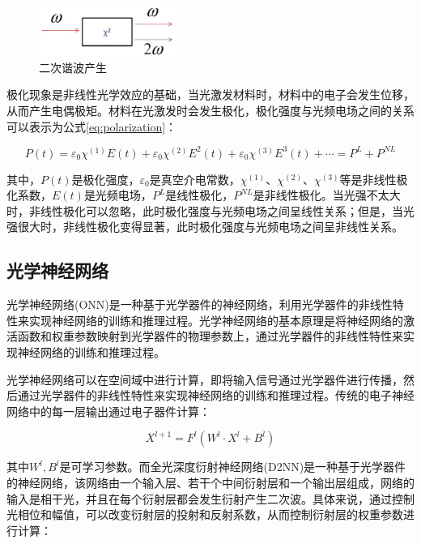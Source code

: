 \begin{figure}[H]
    \centering
    \includegraphics[width=0.4\textwidth]{pics/shg.png}
    \caption{二次谐波产生}
    \label{fig:shg}
\end{figure}

极化现象是非线性光学效应的基础，当光激发材料时，材料中的电子会发生位移，从而产生电偶极矩。材料在光激发时会发生极化，极化强度与光频电场之间的关系可以表示为公式\ref{eq:polarization}：

\begin{equation}
    P(t) = \varepsilon_0 \chi^{(1)} E(t) + \varepsilon_0 \chi^{(2)} E^2(t) + \varepsilon_0 \chi^{(3)} E^3(t) + \cdots = P^L + P^{NL}
    \label{eq:polarization}
\end{equation}

其中，$P(t)$是极化强度，$\varepsilon_0$是真空介电常数，$\chi^{(1)}$、$\chi^{(2)}$、$\chi^{(3)}$等是非线性极化系数，$E(t)$是光频电场，$P^L$是线性极化，$P^{NL}$是非线性极化。当光强不太大时，非线性极化可以忽略，此时极化强度与光频电场之间呈线性关系；但是，当光强很大时，非线性极化变得显著，此时极化强度与光频电场之间呈非线性关系。

\subsection{光学神经网络}

光学神经网络(ONN)是一种基于光学器件的神经网络，利用光学器件的非线性特性来实现神经网络的训练和推理过程。光学神经网络的基本原理是将神经网络的激活函数和权重参数映射到光学器件的物理参数上，通过光学器件的非线性特性来实现神经网络的训练和推理过程。

光学神经网络可以在空间域中进行计算，即将输入信号通过光学器件进行传播，然后通过光学器件的非线性特性来实现神经网络的训练和推理过程。传统的电子神经网络中的每一层输出通过电子器件计算：

\begin{equation}
    X^{l+1}=F^l(W^l\cdot X^l+B^l)
\end{equation}

其中$W^l,B^l$是可学习参数。而全光深度衍射神经网络(D2NN)是一种基于光学器件的神经网络，该网络由一个输入层、若干个中间衍射层和一个输出层组成，网络的输入是相干光，并且在每个衍射层都会发生衍射产生二次波。具体来说，通过控制光相位和幅值，可以改变衍射层的投射和反射系数，从而控制衍射层的权重参数进行计算：


